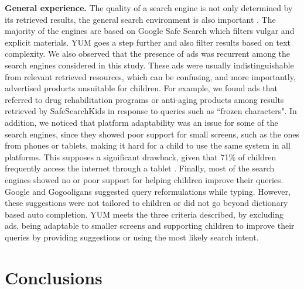 \documentclass{sig-alternate-05-2015}
\begin{document}
\noindent
\textbf{General experience.} The quality of a search engine is not only determined by its retrieved results, the general search environment is also important \cite{Gos13}. The majority of the engines are based on Google Safe Search which filters vulgar and explicit materials. YUM goes a step further and also filter results based on text complexity. We also observed that the presence of ads was recurrent among the search engines considered in this study. These ads were usually indistinguishable from relevant retrieved resources, which can be confusing, and more importantly, advertised products unsuitable for children. For example, we found ads that referred to drug rehabilitation programs or anti-aging products among results retrieved by SafeSearchKids in response to queries such as ``frozen characters". In addition, we noticed that platform adaptability was an issue for some of the search engines, since they showed poor support for small screens, such as the ones from phones or tablets, making it hard for a child to use the same system in all platforms. This supposes a significant drawback, given that 71\% of children frequently access the internet through a tablet \cite{ofcom}. Finally, most of the search engines showed no or poor support for helping children improve their queries. Google and Gogooligans suggested query reformulations while typing. However, these suggestions were not tailored to children or did not go beyond dictionary based auto completion. YUM  meets the three criteria described, by excluding ads, being adaptable to smaller screens and supporting children to improve their queries by providing suggestions or using the most likely search intent.

\section{Conclusions}
\end{document}
